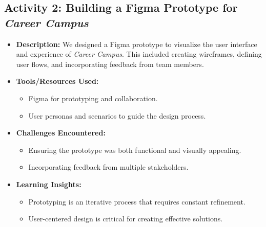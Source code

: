 \documentclass{article}
\begin{document}
\subsection*{Activity 2: Building a Figma Prototype for \textit{Career Campus}}
\begin{itemize}
    \item \textbf{Description:} We designed a Figma prototype to visualize the user interface and experience of \textit{Career Campus}. This included creating wireframes, defining user flows, and incorporating feedback from team members.
    \item \textbf{Tools/Resources Used:}
    \begin{itemize}
        \item Figma for prototyping and collaboration.
        \item User personas and scenarios to guide the design process.
    \end{itemize}
    \item \textbf{Challenges Encountered:}
    \begin{itemize}
        \item Ensuring the prototype was both functional and visually appealing.
        \item Incorporating feedback from multiple stakeholders.
    \end{itemize}
    \item \textbf{Learning Insights:}
    \begin{itemize}
        \item Prototyping is an iterative process that requires constant refinement.
        \item User-centered design is critical for creating effective solutions.
    \end{itemize}
\end{itemize}
\end{document}
